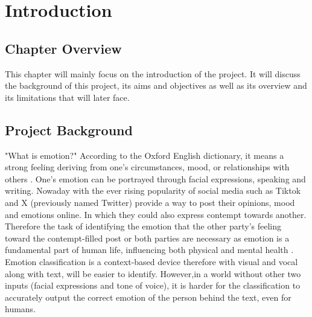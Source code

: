 
\chapter{Introduction}

\singlespaced

\section{Chapter Overview}

This chapter will mainly focus on the introduction of the project. It will discuss the background of this project,
its aims and objectives as well as its overview and its limitations that will later face.

\section{Project Background}

"What is emotion?" According to the Oxford English dictionary, it means a strong feeling deriving from one's circumstances, mood, or relationships with others \cite{oed:akrasia}.
One's emotion can be portrayed through facial expressions, speaking and writing. 
Nowaday with the ever rising popularity of social media such as Tiktok and X (previously named Twitter) provide
a way to post their opinions, mood and emotions online.
In which they could also express contempt towards another.
Therefore the task of identifying the emotion that the other party's feeling toward the contempt-filled post
or both parties are necessary as emotion is a fundamental part of human life, influencing both physical and mental health \cite{AMEER2023118534}.
Emotion classification is a context-based device therefore with visual and vocal along with text, 
will be easier to identify.
However,in a world without other two inputs (facial expressions and tone of voice), 
it is harder for the classification to accurately output the correct emotion
of the person behind the text, even for humans.

